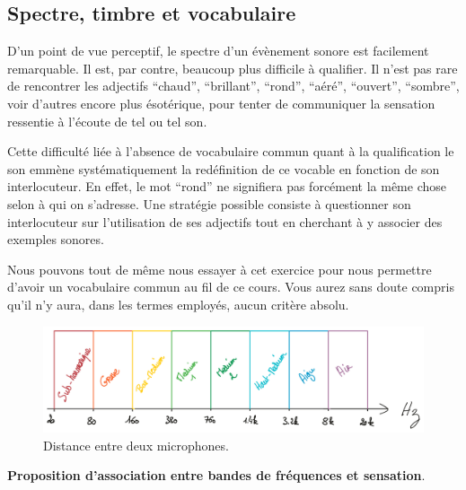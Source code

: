\documentclass[
]{book}
\begin{document}
\hypertarget{spectre-timbre-et-vocabulaire}{%
\subsection{Spectre, timbre et vocabulaire}\label{spectre-timbre-et-vocabulaire}}

D'un point de vue perceptif, le spectre d'un évènement sonore est facilement remarquable. Il est, par contre, beaucoup plus difficile à qualifier. Il n'est pas rare de rencontrer les adjectifs ``chaud'', ``brillant'', ``rond'', ``aéré'', ``ouvert'', ``sombre'', voir d'autres encore plus ésotérique, pour tenter de communiquer la sensation ressentie à l'écoute de tel ou tel son.

Cette difficulté liée à l'absence de vocabulaire commun quant à la qualification le son emmène systématiquement la redéfinition de ce vocable en fonction de son interlocuteur. En effet, le mot ``rond'' ne signifiera pas forcément la même chose selon à qui on s'adresse. Une stratégie possible consiste à questionner son interlocuteur sur l'utilisation de ses adjectifs tout en cherchant à y associer des exemples sonores.

Nous pouvons tout de même nous essayer à cet exercice pour nous permettre d'avoir un vocabulaire commun au fil de ce cours. Vous aurez sans doute compris qu'il n'y aura, dans les termes employés, aucun critère absolu.

\begin{figure}

{\centering \includegraphics[width=1\linewidth]{_resources/drawings/spectre} 

}

\caption{Distance entre deux microphones.}\label{fig:unnamed-chunk-7}
\end{figure}

\textbf{Proposition d'association entre bandes de fréquences et sensation}.
\end{document}
